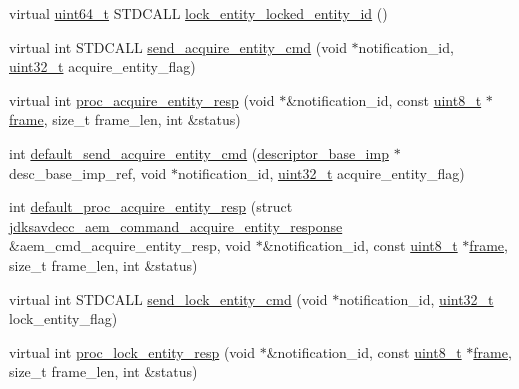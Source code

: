 \begin{DoxyCompactItemize}
\item 
virtual \hyperlink{parse_8c_aec6fcb673ff035718c238c8c9d544c47}{uint64\+\_\+t} S\+T\+D\+C\+A\+LL \hyperlink{classavdecc__lib_1_1descriptor__base__imp_aeb8f096d55f82522516cbf00a616246a}{lock\+\_\+entity\+\_\+locked\+\_\+entity\+\_\+id} ()
\item 
virtual int S\+T\+D\+C\+A\+LL \hyperlink{classavdecc__lib_1_1descriptor__base__imp_aea9e3053b75477816c15487d3e9a6f70}{send\+\_\+acquire\+\_\+entity\+\_\+cmd} (void $\ast$notification\+\_\+id, \hyperlink{parse_8c_a6eb1e68cc391dd753bc8ce896dbb8315}{uint32\+\_\+t} acquire\+\_\+entity\+\_\+flag)
\item 
virtual int \hyperlink{classavdecc__lib_1_1descriptor__base__imp_a934de13d0b017574d514ce276180a004}{proc\+\_\+acquire\+\_\+entity\+\_\+resp} (void $\ast$\&notification\+\_\+id, const \hyperlink{stdint_8h_aba7bc1797add20fe3efdf37ced1182c5}{uint8\+\_\+t} $\ast$\hyperlink{gst__avb__playbin_8c_ac8e710e0b5e994c0545d75d69868c6f0}{frame}, size\+\_\+t frame\+\_\+len, int \&status)
\item 
int \hyperlink{classavdecc__lib_1_1descriptor__base__imp_a4ee5f42b89a728627bf1340afebc7c82}{default\+\_\+send\+\_\+acquire\+\_\+entity\+\_\+cmd} (\hyperlink{classavdecc__lib_1_1descriptor__base__imp}{descriptor\+\_\+base\+\_\+imp} $\ast$desc\+\_\+base\+\_\+imp\+\_\+ref, void $\ast$notification\+\_\+id, \hyperlink{parse_8c_a6eb1e68cc391dd753bc8ce896dbb8315}{uint32\+\_\+t} acquire\+\_\+entity\+\_\+flag)
\item 
int \hyperlink{classavdecc__lib_1_1descriptor__base__imp_ad248d7d7060e28eb36c8dc37d2653c43}{default\+\_\+proc\+\_\+acquire\+\_\+entity\+\_\+resp} (struct \hyperlink{structjdksavdecc__aem__command__acquire__entity__response}{jdksavdecc\+\_\+aem\+\_\+command\+\_\+acquire\+\_\+entity\+\_\+response} \&aem\+\_\+cmd\+\_\+acquire\+\_\+entity\+\_\+resp, void $\ast$\&notification\+\_\+id, const \hyperlink{stdint_8h_aba7bc1797add20fe3efdf37ced1182c5}{uint8\+\_\+t} $\ast$\hyperlink{gst__avb__playbin_8c_ac8e710e0b5e994c0545d75d69868c6f0}{frame}, size\+\_\+t frame\+\_\+len, int \&status)
\item 
virtual int S\+T\+D\+C\+A\+LL \hyperlink{classavdecc__lib_1_1descriptor__base__imp_a26fd66d8c409502eaa4dba47742ca7fa}{send\+\_\+lock\+\_\+entity\+\_\+cmd} (void $\ast$notification\+\_\+id, \hyperlink{parse_8c_a6eb1e68cc391dd753bc8ce896dbb8315}{uint32\+\_\+t} lock\+\_\+entity\+\_\+flag)
\item 
virtual int \hyperlink{classavdecc__lib_1_1descriptor__base__imp_a6cd2b73ea95b18f07dbdc251140679b0}{proc\+\_\+lock\+\_\+entity\+\_\+resp} (void $\ast$\&notification\+\_\+id, const \hyperlink{stdint_8h_aba7bc1797add20fe3efdf37ced1182c5}{uint8\+\_\+t} $\ast$\hyperlink{gst__avb__playbin_8c_ac8e710e0b5e994c0545d75d69868c6f0}{frame}, size\+\_\+t frame\+\_\+len, int \&status)

\end{DoxyCompactItemize}
